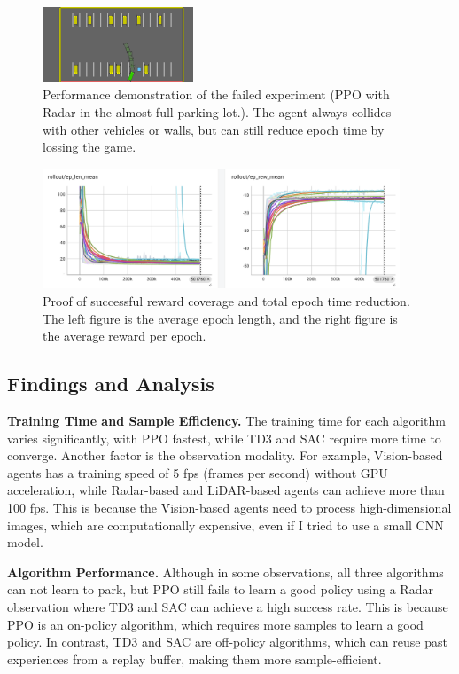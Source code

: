 \documentclass{article}
\begin{document}
\begin{figure}[h]
  \centering
  \includegraphics[width=0.4\textwidth]{./pics/miss/kine_PPO_almost_full.png}
  \caption{Performance demonstration of the failed experiment (PPO with Radar in the almost-full parking lot.). The agent always collides with other vehicles or walls, but can still reduce epoch time by lossing the game.}
  \label{fig:demo_fail}
\end{figure}

\begin{figure}[h]
  \centering
  \includegraphics[width=0.95\textwidth]{./pics/coverage.png}
  \caption{Proof of successful reward coverage and total epoch time reduction. The left figure is the average epoch length, and the right figure is the average reward per epoch.}
  \label{fig:coverage}
\end{figure}

\subsection{Findings and Analysis}

\textbf{Training Time and Sample Efficiency.} The training time for each algorithm varies significantly, with PPO fastest, while TD3 and SAC require more time to converge. Another factor is the observation modality. For example, Vision-based agents has a training speed of 5 fps (frames per second) without GPU acceleration, while Radar-based and LiDAR-based agents can achieve more than 100 fps. This is because the Vision-based agents need to process high-dimensional images, which are computationally expensive, even if I tried to use a small CNN model.

\textbf{Algorithm Performance.} Although in some observations, all three algorithms can not learn to park, but PPO still fails to learn a good policy using a Radar observation where TD3 and SAC can achieve a high success rate. This is because PPO is an on-policy algorithm, which requires more samples to learn a good policy. In contrast, TD3 and SAC are off-policy algorithms, which can reuse past experiences from a replay buffer, making them more sample-efficient.
\end{document}
